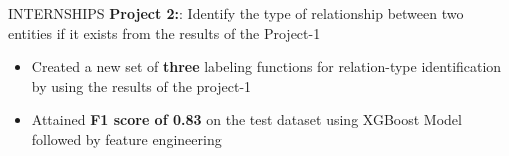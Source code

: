 \documentclass{resume} %
\begin{document}
\begin{rSection}{INTERNSHIPS}
 {{\bf Project 2:}: Identify the type of relationship between two entities if it exists from the results of the Project-1}
 \begin{itemize}
    \itemsep -3pt {} 
     \item Created a new set of \textbf{three} labeling functions for relation-type identification by using the results of the project-1
     \item Attained \textbf{F1 score of 0.83} on the test dataset using XGBoost Model followed by feature engineering

 \end{itemize}

 

\end{rSection} 
\end{document}
